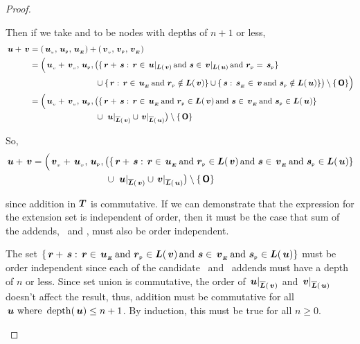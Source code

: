 \begin{proposition}
\begin{proof}
\begin{description}
      Then if we take  and  to be nodes with depths
      of \(n+1\) or less,
      \begin{align*}
          \node{u} + \node{v} &= (\nv{u}, \nlabel{u}, \extn{u}) + (\nv{v}, \nlabel{v}, \extn{v}) \notag\\
          &= \Bigl(\nv{u} + \nv{v}, \nlabel{u}, \bigl(\{\node{r}+\node{s} : \node{r} \in \restrictedto{u}{v} \mand \node{s} \in \restrictedto{v}{u}\mand\nlabel{r} = \nlabel{s}\} \notag\\
          & \qquad \qquad \qquad \qquad \cup \{\node{r} : \node{r} \in \extn{u}\mand\nlabel{r} \notin \nlabels{v}\} \cup \{\node{s} : \extn{s} \in \node{v}\mand\nlabel{s} \notin \nlabels{u}\}\bigr) \setminus \{\zerotree\}\Bigr) \notag\\
          &= \Bigl(\nv{u} + \nv{v}, \nlabel{u}, \bigl(\{\node{r}+\node{s} : \node{r} \in \extn{u} \mand \nlabel{r} \in \nlabels{v} \mand \node{s} \in \extn{v}\mand\nlabel{s} \in \nlabels{u}\} \notag\\
          & \qquad \qquad \qquad \qquad         \cup \nrestrictedto{\node{u}}{v} \cup \nrestrictedto{v}{u}\bigr) \setminus \{\zerotree\}
      \end{align*}
          
      So,
      \begin{align*}
          \node{u} + \node{v} &= \Bigl(\nv{v} + \nv{u}, \nlabel{u}, \bigl(\{\node{r}+\node{s} : \node{r} \in \extn{u} \mand \nlabel{r} \in \nlabels{v} \mand \node{s} \in \extn{v}\mand\nlabel{s} \in \nlabels{u}\} \notag\\
          & \qquad \qquad \qquad \qquad         \cup \nrestrictedto{\node{u}}{v} \cup \nrestrictedto{v}{u}\bigr) \setminus \{\zerotree\}
      \end{align*}

      since addition in $\DOM$ is commutative. If we can demonstrate
      that the expression for the extension set is independent of
      order, then it must be the case that sum of the addends,
      \ and , must also be order independent.
      
      The set \(\{\node{r}+\node{s}:\node{r}\in\extn{u}\mand\nlabel{r}\in\nlabels{v}\mand\node{s}\in\extn{v}\mand\nlabel{s}\in\nlabels{u}\}\) must be
      order independent since each of the candidate \ and \ addends must have a depth of \(n\) or less. Since set union is
      commutative, the order of \(\nrestrictedto{u}{v}\) and \(\nrestrictedto{v}{u}\) doesn't affect the result, thus, addition must be commutative
      for all \(\node{u} \text{ where } \depth({\node{u}}) \leq n+1\).  By induction, this must be true for all \(n \geq 0\).


\end{description}
\end{proof}
\end{proposition}
